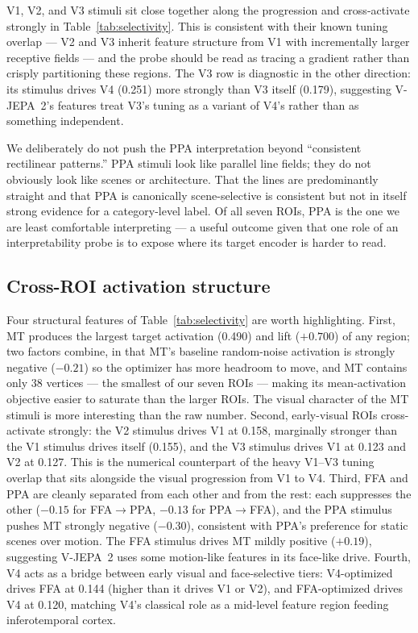 \documentclass{article}
\begin{document}
V1, V2, and V3 stimuli sit close together along the progression and cross-activate strongly in Table~\ref{tab:selectivity}. This is consistent with their known tuning overlap --- V2 and V3 inherit feature structure from V1 with incrementally larger receptive fields --- and the probe should be read as tracing a gradient rather than crisply partitioning these regions. The V3 row is diagnostic in the other direction: its stimulus drives V4 (0.251) more strongly than V3 itself (0.179), suggesting V-JEPA~2's features treat V3's tuning as a variant of V4's rather than as something independent.

We deliberately do not push the PPA interpretation beyond ``consistent rectilinear patterns.'' PPA stimuli look like parallel line fields; they do not obviously look like scenes or architecture. That the lines are predominantly straight and that PPA is canonically scene-selective is consistent but not in itself strong evidence for a category-level label. Of all seven ROIs, PPA is the one we are least comfortable interpreting --- a useful outcome given that one role of an interpretability probe is to expose where its target encoder is harder to read.

\subsection{Cross-ROI activation structure}
\label{sec:discussion-cross-roi}
Four structural features of Table~\ref{tab:selectivity} are worth highlighting. First, MT produces the largest target activation (0.490) and lift ($+0.700$) of any region; two factors combine, in that MT's baseline random-noise activation is strongly negative ($-0.21$) so the optimizer has more headroom to move, and MT contains only 38 vertices --- the smallest of our seven ROIs --- making its mean-activation objective easier to saturate than the larger ROIs. The visual character of the MT stimuli is more interesting than the raw number. Second, early-visual ROIs cross-activate strongly: the V2 stimulus drives V1 at 0.158, marginally stronger than the V1 stimulus drives itself (0.155), and the V3 stimulus drives V1 at 0.123 and V2 at 0.127. This is the numerical counterpart of the heavy V1--V3 tuning overlap that sits alongside the visual progression from V1 to V4. Third, FFA and PPA are cleanly separated from each other and from the rest: each suppresses the other ($-0.15$ for FFA$\to$PPA, $-0.13$ for PPA$\to$FFA), and the PPA stimulus pushes MT strongly negative ($-0.30$), consistent with PPA's preference for static scenes over motion. The FFA stimulus drives MT mildly positive ($+0.19$), suggesting V-JEPA~2 uses some motion-like features in its face-like drive. Fourth, V4 acts as a bridge between early visual and face-selective tiers: V4-optimized drives FFA at 0.144 (higher than it drives V1 or V2), and FFA-optimized drives V4 at 0.120, matching V4's classical role as a mid-level feature region feeding inferotemporal cortex.
\end{document}
